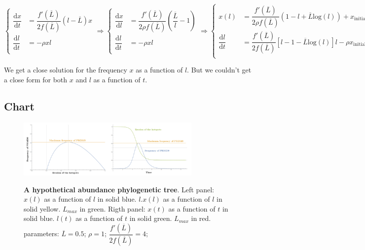 \documentclass{article}
\begin{document}
\begin{equation}
  \left\{
      \begin{aligned}
          \dfrac{\mathrm{d}x}{\mathrm{d}t} &= \dfrac{f'(\overline{L})}{2 f(\overline{L})} \left( l - \overline{L} \right) x \\
        \dfrac{\mathrm{d}l}{\mathrm{d}t} &= 
        - \rho x l \\
      \end{aligned}
    \right.
 \Rightarrow
  \left\{
      \begin{aligned}
          \dfrac{\mathrm{d}x}{\mathrm{d}l} &= \dfrac{f'(\overline{L})}{2 \rho f(\overline{L})}\left( \dfrac{\overline{L}}{l} -1 \right) \\
        \dfrac{\mathrm{d}l}{\mathrm{d}t} &= 
        - \rho x l \\
      \end{aligned}
    \right.
 \Rightarrow
  \left\{
      \begin{aligned}
          x(l) &=\dfrac{f'(\overline{L})}{2 \rho f(\overline{L})} (1-l + \overline{L} \mathrm{log}(l)) + x_{\mathrm{initial}} \\
        \dfrac{\mathrm{d}l}{\mathrm{d}t} &= 
         \dfrac{f'(\overline{L})}{2 f(\overline{L})} [ l-1- \overline{L} \mathrm{log}(l)]l  - \rho x_{\mathrm{initial}} l \\
      \end{aligned}
    \right.
\end{equation}

We get a close solution for the frequency $x$ as a function of $l$. But we couldn't get a close form for both $x$ and $l$ as a function of $t$.


\subsection{Chart}
	\begin{figure}[H]
	  \centering
       \includegraphics[width=9.0cm]{Images/SingleAllele.png}\\
		\caption{ \textbf{A hypothetical abundance phylogenetic tree}. 
		\label{fig:singleallele}
		Left panel:  
$x(l)$ as a function of $l$ in solid blue.   
$l.x(l)$ as a function of $l$ in solid yellow.  
$L_{max}$ in green. 
Rigth panel:  
$x(t)$ as a function of $t$ in solid blue.   
$l(t)$ as a function of $t$ in solid green.  
$L_{max}$ in red. 
parameters: $\overline{L} = 0.5$; $\rho = 1$; $\dfrac{f'(\overline{L})}{2 f(\overline{L})} = 4$;}
	\end{figure}
\end{document}
